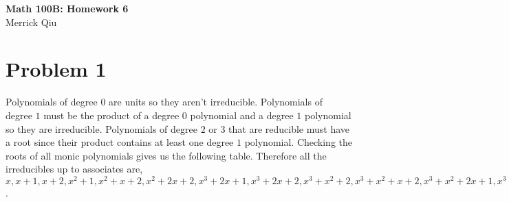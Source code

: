 \documentclass{article}
\begin{document}
\begin{center}
	\huge{\bf Math 100B: Homework 6} \\
	Merrick Qiu
\end{center}

\section*{Problem 1}
Polynomials of degree $0$ are units so they aren't irreducible. 
Polynomials of degree $1$ must be the product of a degree $0$ polynomial and a degree $1$ polynomial so they are irreducible.
Polynomials of degree $2$ or $3$ that are reducible must have a root since their product contains at least one degree $1$ 
polynomial.
Checking the roots of all monic polynomials gives us the following table.
Therefore all the irreducibles up to associates are,
$x,x+1,x+2,x^2+1,x^2+x+2,x^2+2x+2,x^3+2x+1,x^3+2x+2,x^3+x^2+2,x^3+x^2+x+2,x^3+x^2+2x+1,x^3+2x^2+1, x^3+2x^2+x+1, x^3+2x^2+2x+2$.
\end{document}
